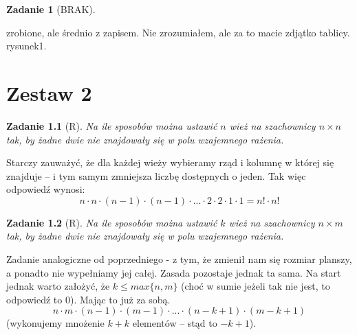 \documentclass{mwbk}
\newtheorem{zad}{Zadanie}[chapter]
\begin{document}
\begin{zad}[BRAK]

\end{zad}
\begin{mdframed}
    zrobione, ale średnio z zapisem.
    Nie zrozumiałem, ale za to macie zdjątko tablicy.
    rysunek1.
\end{mdframed}



















\chapter{Zestaw 2}          %

\begin{zad}[R]
    Na ile sposobów można ustawić $n$ wież na szachownicy
    $n \times n$ tak, by żadne dwie nie znajdowały się w
    polu wzajemnego rażenia.
\end{zad}
\begin{mdframed}
    Starczy zauważyć, że dla każdej wieży wybieramy rząd i kolumnę
    w której się znajduje -- i tym samym zmniejsza liczbę dostępnych
    o jeden. Tak więc odpowiedź wynosi: \[n \cdot n \cdot (n-1) \cdot
        (n-1) \cdot ... \cdot 2 \cdot 2 \cdot 1 \cdot 1 =  n! \cdot n!\]
\end{mdframed}




\begin{zad}[R]
    Na ile sposobów można ustawić $k$ wież na szachownicy $n \times m$
    tak, by żadne dwie nie znajdowały się w polu wzajemnego rażenia.
\end{zad}
\begin{mdframed}
    Zadanie analogiczne od poprzedniego - z tym, że zmienił nam się
    rozmiar planszy, a ponadto nie wypełniamy jej całej. Zasada
    pozostaje jednak ta sama. Na start jednak warto założyć, że
    $k \leq max\{n, m\}$ (choć w sumie jeżeli tak nie jest, to
    odpowiedź to 0). Mając to już za sobą.
    \[n \cdot m \cdot (n-1) \cdot (m-1) \cdot ... \cdot (n - k +1) \cdot (m -k +1)\]
    (wykonujemy mnożenie $k + k$ elementów -- stąd to $-k + 1$).
\end{mdframed}
\end{document}
